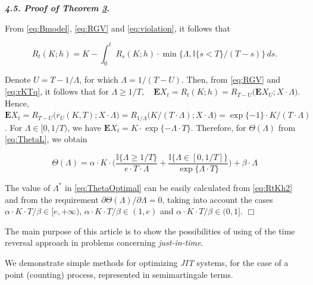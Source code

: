 


\textbf{\emph{4.5. Proof of Theorem \hyperlink{b:Th3}{3}}.}

From \eqref{eq:Bmodel}, \eqref{eq:RGV} and \eqref{eq:violation}, it follows that

\begin{equation}\label{eq:RtKh1}

{R_t}(K; h) = K -  \int_{0}^{t}\!\ {R_s}(K; h)\cdot \min\{\Lambda, \mathbb{I}\{s<T\} / (T- s) \}\,ds.

\end{equation}

Denote $U=T-1 / \Lambda$, for which $\Lambda=1 / (T-U)$. Then, from \eqref{eq:RGV} and \eqref{eq:rKTq}, it follows that for $\Lambda \geq 1 / T, \quad \textbf{E}X_t = {R_t}(K; h) = {R_{T-U}}\big(\textbf{E}X_U; X\cdot \Lambda\big)$. Hence,  $\textbf{E}X_t={R_{T-U}}\big({r_U}(K, T); X \cdot\Lambda \big)=R_{1 / {\Lambda}}\big( K / (T\cdot \Lambda ); X\cdot \Lambda \big) = \exp\{-1\}\cdot K / (T\cdot \Lambda)$. For $\Lambda \in [0, 1 / T)$, we have $\textbf{E}X_t = K\cdot \exp\{-\Lambda \cdot T\}$. Therefore, for $\Theta( \Lambda)$ from \eqref{eq:ThetaL}, we obtain 

\begin{equation}\label{eq:RtKh2}

	\Theta( \Lambda) = \alpha \cdot K \cdot \Big( \frac{\mathbb{I}\{\Lambda\geq 1 / T\}}{e \cdot T \cdot \Lambda} + \frac{\mathbb{I}\{\Lambda \in [0, 1 / T] \}}{\exp\{\Lambda \cdot T \}} \Big) + \beta \cdot \Lambda

\end{equation}

The value of ${\Lambda}^*$ in \eqref{eq:ThetaOptimal} can be easily calculated from \eqref{eq:RtKh2} and from the requirement $\partial \Theta(\Lambda) / \partial\Lambda=0$, taking into account the cases $\alpha \cdot K \cdot T / \beta \in [e, +\infty)$, $\alpha \cdot K \cdot T / \beta \in (1, e)$ and $\alpha \cdot K \cdot T / \beta \in (0, 1]$. \hfill $\Box$



\smallskip




The main purpose of this article is to show the possibilities of using of the time reversal approach in problems concerning  \emph{just-in-time}. 

We demonstrate simple methods for optimizing  \emph{JIT} systems, for the case of a point (counting) process, represented in semimartingale terms. 

